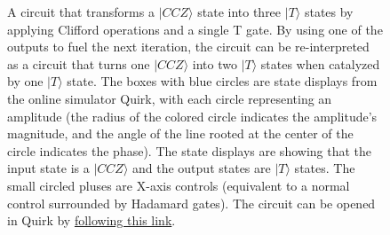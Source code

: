 \documentclass[twocolumn,accepted=2019-03-30]{quantumarticle}
\begin{document}
\begin{figure}
    \label{fig:catalysis-circuit-simple}
    \centering
    \caption{
      A circuit that transforms a $|CCZ\rangle$ state into three $|T\rangle$ states by applying Clifford operations and a single T gate.
      By using one of the outputs to fuel the next iteration, the circuit can be re-interpreted as a circuit that turns one $|CCZ\rangle$ into two $|T\rangle$ states when catalyzed by one $|T\rangle$ state.
      The boxes with blue circles are state displays from the online simulator Quirk, with each circle representing an amplitude (the radius of the colored circle indicates the amplitude's magnitude, and the angle of the line rooted at the center of the circle indicates the phase).
      The state displays are showing that the input state is a $|CCZ\rangle$ and the output states are $|T\rangle$ states.
      The small circled pluses are X-axis controls (equivalent to a normal control surrounded by Hadamard gates).
      The circuit can be opened in Quirk by \href{http://algassert.com/quirk\#circuit=\%7B\%22cols\%22\%3A\%5B\%5B\%22H\%22\%2C\%22H\%22\%2C\%22H\%22\%5D\%2C\%5B\%22\%E2\%80\%A2\%22\%2C\%22\%E2\%80\%A2\%22\%2C\%22Z\%22\%5D\%2C\%5B\%22Amps3\%22\%5D\%2C\%5B\%5D\%2C\%5B1\%2C1\%2C\%22X\%5E-\%C2\%BD\%22\%5D\%2C\%5B\%22X\%22\%2C\%22X\%22\%2C\%22\%E2\%97\%A6\%22\%5D\%2C\%5B\%22Z\%22\%2C\%22Z\%22\%2C\%22\%E2\%8A\%96\%22\%5D\%2C\%5B1\%2C1\%2C\%22Z\%5E-\%C2\%BC\%22\%5D\%2C\%5B\%22Z\%22\%2C\%22Z\%22\%2C\%22\%E2\%8A\%96\%22\%5D\%2C\%5B\%22Amps1\%22\%2C\%22Amps1\%22\%2C\%22Amps1\%22\%5D\%5D\%7D}{following this link}.
    }
\end{figure}
\end{document}
